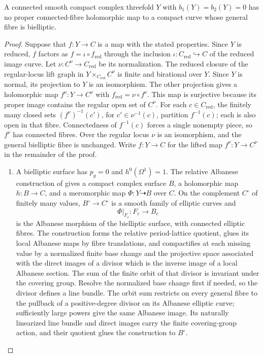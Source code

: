 \begin{proposition}\hypertarget{tag-01FD}{}\label{cdp:st:C.3.7}


A connected smooth compact complex threefold $Y$ with $b_1(Y)=b_2(Y)=0$ has no
proper connected-fibre holomorphic map to a compact curve whose
general fibre is bielliptic.
\end{proposition}


\begin{proof}

Suppose that $f:Y\to C$ is a map with the stated properties.
Since $Y$ is reduced, $f$ factors as $f=\iota\circ f_{\mathrm{red}}$
through the inclusion $\iota:C_{\mathrm{red}}\hookrightarrow C$ of the
reduced image curve. Let $\nu:C^\nu\to C_{\mathrm{red}}$ be its
normalization. The reduced closure of the regular-locus lift graph in
$Y\times_{C_{\mathrm{red}}}C^\nu$ is finite and birational over $Y$.
Since $Y$ is normal, its projection to $Y$ is an isomorphism. The other
projection gives a holomorphic map $f^\nu:Y\to C^\nu$ with
$f_{\mathrm{red}}=\nu\circ f^\nu$. This map is surjective because its
proper image contains the regular open set of $C^\nu$. For each
$c\in C_{\mathrm{red}}$, the finitely many closed sets
$(f^\nu)^{-1}(c')$, for $c'\in\nu^{-1}(c)$, partition $f^{-1}(c)$;
each is also open in that fibre. Connectedness of $f^{-1}(c)$ forces
a single nonempty piece, so $f^\nu$ has connected fibres. Over the
regular locus $\nu$ is an isomorphism, and the general bielliptic fibre
is unchanged. Write $f:Y\to C$ for the lifted map $f^\nu:Y\to C^\nu$ in the
remainder of the proof.

\begin{enumerate}[label=\arabic*.,leftmargin=*]
\item A bielliptic surface has
$p_g=0$ and $h^0(\Omega^1)=1$. The relative Albanese construction of
\cite[Proposition~2, pp.~605--608]{Kawai1969} gives a compact complex surface
$B$, a holomorphic map $h:B\to C$, and a meromorphic map
$\Phi:Y\dashrightarrow B$ over $C$. On the complement $C^\circ$
of finitely many values, $B^\circ\to C^\circ$ is a smooth family
of elliptic curves and
\[
 \Phi|_{F_c}:F_c\longrightarrow B_c
\]
is the Albanese morphism of the bielliptic surface, with connected
elliptic fibres. The
construction forms the relative period-lattice quotient, glues its
local Albanese maps by fibre translations, and compactifies at each
missing value by a normalized finite base change and the projective
space associated with the direct images of a divisor which is the
inverse image of a local Albanese section. The sum of the finite orbit of that divisor is invariant under
the covering group. Resolve the normalized base change first if needed, so the
divisor defines a line bundle. The orbit sum restricts on every
general fibre to the pullback of a positive-degree divisor on its
Albanese elliptic curve; sufficiently large powers give the same
Albanese image. Its naturally linearized line bundle and direct
images carry the finite covering-group action, and their quotient
glues the construction to $B^\circ$.


\end{enumerate}
\end{proof}
